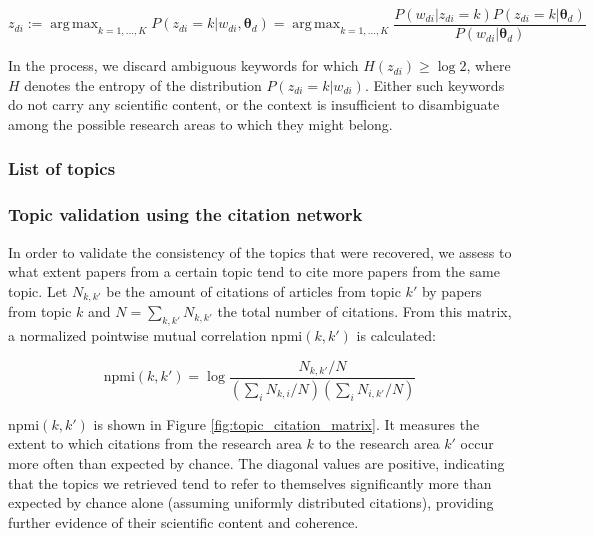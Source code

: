 \documentclass{article}
\DeclareMathOperator*{\argmax}{arg\,max}
\begin{document}
\begin{equation}
    z_{di} := \argmax_{k=1,\dots,K} P(z_{di}=k|w_{di},\bm{\theta}_{d}) =  \argmax_{k=1,\dots,K} \dfrac{P(w_{di}|z_{di}=k)P(z_{di}=k|\bm{\theta}_d)}{P(w_{di}|\bm{\theta}_d)}
\end{equation}

In the process, we discard ambiguous keywords for which $H(z_{di})\geq \log{2}$, where $H$ denotes the entropy of the distribution $P(z_{di}=k|w_{di})$. Either such keywords do not carry any scientific content, or the context is insufficient to disambiguate among the possible research areas to which they might belong.

\subsubsection{List of topics}

\fontsize{6}{7}\selectfont\normalsize

\subsubsection{\label{appendix:citation_validation}Topic validation using the citation network}

In order to validate the consistency of the topics that were recovered, we assess to what extent papers from a certain topic tend to cite more papers from the same topic. Let $N_{k,k'}$ be the amount of citations of articles from topic $k'$ by papers from topic $k$ and $N=\sum_{k,k'}N_{k,k'}$ the total number of citations. From this matrix, a normalized pointwise mutual correlation $\mathrm{npmi}(k,k')$ is calculated:

\begin{equation}
    \mathrm{npmi}(k,k') = \log {\dfrac{N_{k,k'}/N}{(\sum_{i} N_{k,i}/N)(\sum_{i} N_{i,k'}/N)}}
\end{equation}

$\mathrm{npmi}(k,k')$ is shown in Figure \ref{fig:topic_citation_matrix}. It measures the extent to which citations from the research area $k$ to the research area $k'$ occur more often than expected by chance. The diagonal values are positive, indicating that the topics we retrieved tend to refer to themselves significantly more than expected by chance alone (assuming uniformly distributed citations), providing further evidence of their scientific content and coherence.
\end{document}
